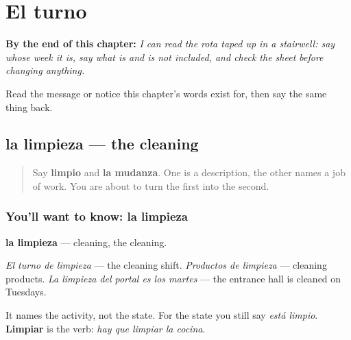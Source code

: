 
\chapter{El turno}
\label{ch:es-limpieza}

\begin{chapteropening}
\textbf{By the end of this chapter:} \emph{I can read the rota taped up in a stairwell: say whose week it is, say what is and is not included, and check the sheet before changing anything.}

Read the message or notice this chapter's words exist for, then say the same thing back.
\end{chapteropening}

\section[la limpieza]{la limpieza — the cleaning}

\label{lesson:ES-C453-limpieza}



\begin{quote}
Say \textbf{limpio} and \textbf{la mudanza}. One is a description, the other names a job of work. You are about to turn the first into the second.
\end{quote}

\subsection*{You'll want to know: la limpieza}
\textbf{la limpieza} — cleaning, the cleaning.

\emph{El turno de limpieza} — the cleaning shift. \emph{Productos de limpieza} — cleaning products. \emph{La limpieza del portal es los martes} — the entrance hall is cleaned on Tuesdays.

It names the activity, not the state. For the state you still say \emph{está limpio}. \textbf{Limpiar} is the verb: \emph{hay que limpiar la cocina}.

